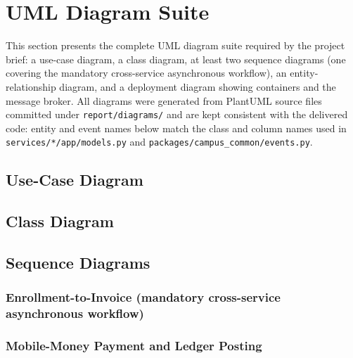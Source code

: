 \section{UML Diagram Suite}
\label{sec:uml-suite}

This section presents the complete UML diagram suite required by the project
brief: a use-case diagram, a class diagram, at least two sequence diagrams
(one covering the mandatory cross-service asynchronous workflow), an
entity-relationship diagram, and a deployment diagram showing containers and
the message broker. All diagrams were generated from PlantUML source files
committed under \texttt{report/diagrams/} and are kept consistent with the
delivered code: entity and event names below match the class and column
names used in \texttt{services/*/app/models.py} and
\texttt{packages/campus\_common/events.py}.

\subsection{Use-Case Diagram}

\subsection{Class Diagram}

\subsection{Sequence Diagrams}
\subsubsection{Enrollment-to-Invoice (mandatory cross-service asynchronous workflow)}

\subsubsection{Mobile-Money Payment and Ledger Posting}

